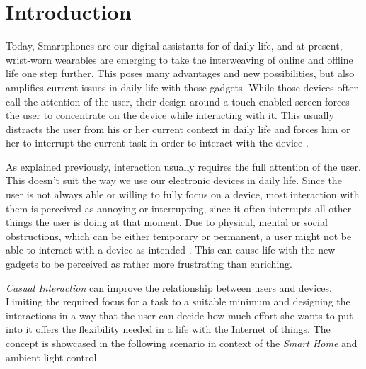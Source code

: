 \chapter{Introduction}

Today, Smartphones are our digital assistants for of daily life, and at present, wrist-worn wearables are emerging to take the interweaving of online and offline life one step further. This poses many advantages and new possibilities, but also amplifies current issues in daily life with those gadgets. While those devices often call the attention of the user, their design around a touch-enabled screen forces the user to concentrate on the device while interacting with it. This usually distracts the user from his or her current context in daily life and forces him or her to interrupt the current task in order to interact with the device \cite{Pohl2013}.

As explained previously, interaction usually requires the full attention of the user. This doesn't suit the way we use our electronic devices in daily life. Since the user is not always able or willing to fully focus on a device, most interaction with them is perceived as annoying or interrupting, since it often interrupts all other things the user is doing at that moment. Due to physical, mental or social obstructions, which can be either temporary or permanent, a user might not be able to interact with a device as intended \cite{Pohl2013}. This can cause life with the new gadgets to be perceived as rather more frustrating than enriching.

\textit{Casual Interaction} can improve the relationship between users and devices. Limiting the required focus for a task to a suitable minimum and designing the interactions in a way that the user can decide how much effort she wants to put into it offers the flexibility needed in a life with the Internet of things. The concept is showcased in the following scenario in context of the \textit{Smart Home} and ambient light control.

